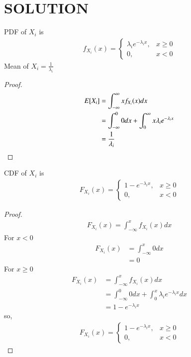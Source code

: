 \documentclass[journal,12pt,twocolumn]{IEEEtran}
\begin{document}
\section{SOLUTION}
\begin{lemma}
PDF of $X_i$ is
\begin{align}
    f_{X_i}(x)=\begin{cases}\lambda_i e^{-\lambda_i x}, &x\geq 0\\
                0, &x<0\nonumber
    \end{cases}    
\end{align}
Mean of $X_i=\frac{1}{\lambda_i}$\\

\end{lemma}
\begin{proof}
\begin{align}
    E[ X_i ]&=\int_{-\infty}^{\infty}x f_{X_i}(x) dx\\
              &=\int_{-\infty}^{0}0 dx + \int_{0}^{\infty}x \lambda_i e^{-\lambda_i x}\\
              &=\frac{1}{\lambda_i}
\end{align}
\end{proof}
\begin{lemma}
  CDF of  $X_i$ is
\begin{align}
    F_{X_i}(x)=\begin{cases}1-e^{-\lambda_i x}, &x\geq 0\\
                0, &x<0\nonumber
    \end{cases}    
\end{align}
\end{lemma}
\begin{proof}
\begin{align}
   F_{X_i}(x)=\int_{-\infty}^{x}f_{X_i}(x)dx
\end{align}
For $x<0$
\begin{align}
    F_{X_i}(x)&=\int_{-\infty}^{x}0dx\\
    &=0
\end{align}
For $x\geq0$
\begin{align}
    F_{X_i}(x)&=\int_{-\infty}^{x}f_{X_i}(x)dx\\
    &=\int_{-\infty}^{0}0dx +\int_{0}^{x}\lambda_i e^{-\lambda_i x}dx\\
    &=1-e^{-\lambda_i x}
\end{align}
so,
\begin{align}
    F_{X_i}(x)=\begin{cases}1-e^{-\lambda_i x}, &x\geq 0\\
                0, &x<0\nonumber
    \end{cases}    
\end{align}
\end{proof}
\end{document}

